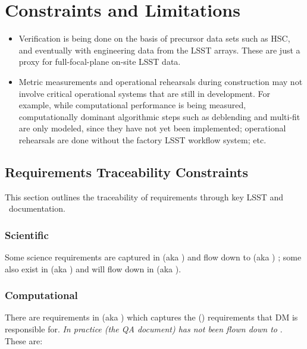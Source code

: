 \section{Constraints and Limitations}

\begin{itemize}

\item Verification is being done on the basis of precursor data sets such as HSC, and eventually with engineering data from the LSST arrays. These are just a proxy for full-focal-plane on-site LSST data.

\item Metric measurements and operational rehearsals during construction may not involve critical operational systems that are still in development. For example, while computational performance is being measured, computationally dominant algorithmic steps such as deblending and multi-fit are only modeled, since they have not yet been implemented; operational rehearsals are done without the factory LSST workflow system; etc.

\end{itemize}

\subsection{Requirements Traceability Constraints}

This section outlines the traceability of requirements through key LSST and \product\ documentation.

\subsubsection{Scientific}

Some science requirements are captured in  (aka \LSR) and flow down to  (aka \OSS) ; some also exist in  (aka \DPDD) and will flow down in  (aka \DMSR).

\subsubsection{Computational}

There are requirements in  (aka \DMSR) which captures the  (\OSS) requirements that DM is responsible for. \textit{In practice  (the QA document) has not been flown down to }. These are:

